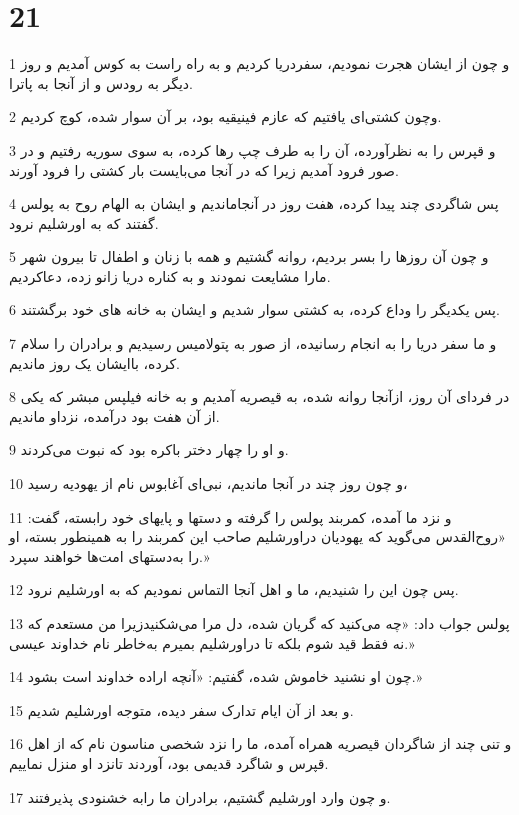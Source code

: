 \chapter{21}

\par 1 و چون از ایشان هجرت نمودیم، سفردریا کردیم و به راه راست به کوس آمدیم و روز دیگر به رودس و از آنجا به پاترا.
\par 2 وچون کشتی‌ای یافتیم که عازم فینیقیه بود، بر آن سوار شده، کوچ کردیم.
\par 3 و قپرس را به نظرآورده، آن را به طرف چپ رها کرده، به سوی سوریه رفتیم و در صور فرود آمدیم زیرا که در آنجا می‌بایست بار کشتی را فرود آورند.
\par 4 پس شاگردی چند پیدا کرده، هفت روز در آنجاماندیم و ایشان به الهام روح به پولس گفتند که به اورشلیم نرود.
\par 5 و چون آن روزها را بسر بردیم، روانه گشتیم و همه با زنان و اطفال تا بیرون شهر مارا مشایعت نمودند و به کناره دریا زانو زده، دعاکردیم.
\par 6 پس یکدیگر را وداع کرده، به کشتی سوار شدیم و ایشان به خانه های خود برگشتند.
\par 7 و ما سفر دریا را به انجام رسانیده، از صور به پتولامیس رسیدیم و برادران را سلام کرده، باایشان یک روز ماندیم.
\par 8 در فردای آن روز، ازآنجا روانه شده، به قیصریه آمدیم و به خانه فیلپس مبشر که یکی از آن هفت بود درآمده، نزداو ماندیم.
\par 9 و او را چهار دختر باکره بود که نبوت می‌کردند.
\par 10 و چون روز چند در آنجا ماندیم، نبی‌ای آغابوس نام از یهودیه رسید،
\par 11 و نزد ما آمده، کمربند پولس را گرفته و دستها و پایهای خود رابسته، گفت: «روح‌القدس می‌گوید که یهودیان دراورشلیم صاحب این کمربند را به همینطور بسته، او را به‌دستهای امت‌ها خواهند سپرد.»
\par 12 پس چون این را شنیدیم، ما و اهل آنجا التماس نمودیم که به اورشلیم نرود.
\par 13 پولس جواب داد: «چه می‌کنید که گریان شده، دل مرا می‌شکنیدزیرا من مستعدم که نه فقط قید شوم بلکه تا دراورشلیم بمیرم به‌خاطر نام خداوند عیسی.»
\par 14 چون او نشنید خاموش شده، گفتیم: «آنچه اراده خداوند است بشود.»
\par 15 و بعد از آن ایام تدارک سفر دیده، متوجه اورشلیم شدیم.
\par 16 و تنی چند از شاگردان قیصریه همراه آمده، ما را نزد شخصی مناسون نام که از اهل قپرس و شاگرد قدیمی بود، آوردند تانزد او منزل نماییم.
\par 17 و چون وارد اورشلیم گشتیم، برادران ما رابه خشنودی پذیرفتند.
